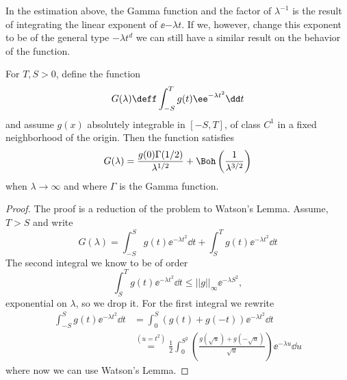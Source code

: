 In the estimation above, the Gamma function and the factor of $\lambda^{-1}$ is the result of integrating the linear exponent of $\ee{-\lambda t}$. If we, however, change this exponent to be of the general type $-\lambda t^d$ we can still have a similar result on the behavior of the function.

\begin{proposicao}	
	For $T, S > 0$, define the function
	\begin{equation}
		G(\lambda) \deff \int_{-S}^{T} g(t) \ee^{-\lambda t^2} \dd t
	\end{equation}
	and assume $g(x)$ absolutely integrable in $[-S, T]$, of class $C^1$ in a fixed neighborhood of the origin. Then the function satisfies
	\begin{equation}
		G(\lambda) = \frac{g(0) \Gamma(1/2)}{\lambda^{1/2}} + \Boh \left(\frac{1}{\lambda^{3/2}} \right)
	\end{equation}
	when $\lambda \rightarrow \infty$ and where $\Gamma$ is the Gamma function.
	\label{prop: cor watson}
\end{proposicao}

\begin{proof}
	The proof is a reduction of the problem to Watson's Lemma. Assume, $T>S$ and write
	\begin{equation}
		G(\lambda) = \int_{-S}^{S} g(t) \ee^{-\lambda t^2} \dd t + \int_{S}^{T} g(t) \ee^{-\lambda t^2} \dd t
	\end{equation}
	The second integral we know to be of order
	\begin{equation}
		\int_{S}^{T} g(t) \ee^{-\lambda t^2} \dd t \leq ||g||_{\infty} \ee^{-\lambda S^2},
	\end{equation}
	exponential on $\lambda$, so we drop it. For the first integral we rewrite
		\begin{align}
			\int_{-S}^{S} g(t) \ee^{-\lambda t^2} \dd t & = \int_{0}^{S} (g(t) + g(-t)) \ee^{-\lambda t^2}\dd t \\
			& \stackrel{(u= t^2)}{=} \frac{1}{2} \int_{0}^{S^2} \left(\frac{g\left(\sqrt{u}\right) + g\left(-\sqrt{u}\right)}{\sqrt{u}}\right) \ee^{-\lambda u} \dd u
		\end{align}
	where now we can use Watson's Lemma.
\end{proof}

